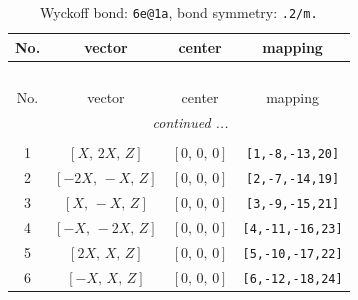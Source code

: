 \documentclass[fleqn,8pt]{jsarticle}
\begin{document}
\renewcommand{\arraystretch}{1.2}
\begin{longtable}{cccc}
\caption{Wyckoff bond: {\tt 6e@1a}, bond symmetry: {\tt .2/m.}}
 \\
 \hline \hline
No. & vector & center & mapping \\ \hline \endfirsthead

\multicolumn{3}{l}{\tablename\ \thetable{}} \\
 \hline \hline
No. & vector & center & mapping \\ \hline \endhead

 \hline \hline
\multicolumn{3}{r}{\footnotesize\it continued ...} \\ \endfoot

 \hline \hline
\multicolumn{3}{r}{} \\ \endlastfoot

1 & $\left[ X,\, 2 X,\, Z \right]$ & $\left[ 0,\, 0,\, 0 \right]$ & {\tt [1,-8,-13,20]} \\ \hline
2 & $\left[ - 2 X,\, - X,\, Z \right]$ & $\left[ 0,\, 0,\, 0 \right]$ & {\tt [2,-7,-14,19]} \\ \hline
3 & $\left[ X,\, - X,\, Z \right]$ & $\left[ 0,\, 0,\, 0 \right]$ & {\tt [3,-9,-15,21]} \\ \hline
4 & $\left[ - X,\, - 2 X,\, Z \right]$ & $\left[ 0,\, 0,\, 0 \right]$ & {\tt [4,-11,-16,23]} \\ \hline
5 & $\left[ 2 X,\, X,\, Z \right]$ & $\left[ 0,\, 0,\, 0 \right]$ & {\tt [5,-10,-17,22]} \\ \hline
6 & $\left[ - X,\, X,\, Z \right]$ & $\left[ 0,\, 0,\, 0 \right]$ & {\tt [6,-12,-18,24]} \\
\end{longtable}
\renewcommand{\arraystretch}{1.2}
\end{document}

